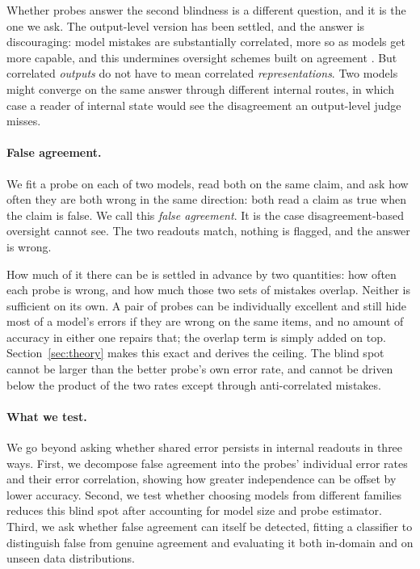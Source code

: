Whether probes answer the second blindness is a different question, and it is the
one we ask. The output-level version has been settled, and the answer is
discouraging: model mistakes are substantially correlated, more so as models get
more capable, and this undermines oversight schemes built on agreement
\citep{goel2025alike,kim2025correlated}. But correlated \emph{outputs} do not
have to mean correlated \emph{representations}. Two models might converge on the
same answer through different internal routes, in which case a reader of
internal state would see the disagreement an output-level judge misses.

\paragraph{False agreement.}
We fit a probe on each of two models, read both on the same claim, and ask how
often they are both wrong in the same direction: both read a claim as true when
the claim is false. We call this \emph{false agreement}. It is the case
disagreement-based oversight cannot see. The two readouts match, nothing is
flagged, and the answer is wrong.

How much of it there can be is settled in advance by two quantities: how often
each probe is wrong, and how much those two sets of mistakes overlap. Neither is
sufficient on its own. A pair of probes can be individually excellent and still
hide most of a model's errors if they are wrong on the same items, and no amount
of accuracy in either one repairs that; the overlap term is simply added on top.
Section~\ref{sec:theory} makes this exact and derives the ceiling. The blind spot
cannot be larger than the better probe's own error rate, and cannot be driven
below the product of the two rates except through anti-correlated mistakes.

\paragraph{What we test.}
We go beyond asking whether shared error persists in internal readouts in three
ways. First, we decompose false agreement into the probes' individual error
rates and their error correlation, showing how greater independence can be
offset by lower accuracy. Second, we test whether choosing models from different
families reduces this blind spot after accounting for model size and probe
estimator. Third, we ask whether false agreement can itself be detected, fitting
a classifier to distinguish false from genuine agreement and evaluating it both
in-domain and on unseen data distributions.


